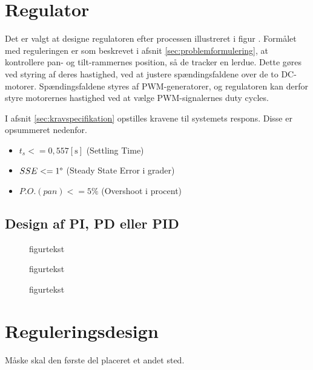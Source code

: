 \section{Regulator}
\label{sec:kontrollerdeign}
Det er valgt at designe regulatoren efter processen illustreret i figur .%
Formålet med reguleringen er som beskrevet i afsnit \ref{sec:problemformulering},
at kontrollere pan- og tilt-rammernes position, så de tracker en lerdue.
Dette gøres ved styring af deres hastighed, ved at justere spændingsfaldene over de
to DC-motorer. Spændingsfaldene styres af PWM-generatorer, og regulatoren
kan derfor styre motorernes hastighed ved at vælge PWM-signalernes duty cycles.

I afsnit \ref{sec:kravspecifikation} opstilles kravene til systemets respons.
Disse er opsummeret nedenfor.
\begin{itemize}
\item \(t_{s} <= 0,557 \mathrm{\left[s\right]}\) (Settling Time)
\item \(SSE <= 1 \degree\) (Steady State Error i grader)
\item \(P.O. (pan) <= 5 \%\) (Overshoot i procent)
\end{itemize}


\subsection{Design af PI, PD eller PID}
\begin{figure}[!th]
\centering
\begin{tikzpicture}[auto, node distance=2.6cm,>=latex']

\end{tikzpicture}
\caption[tekst i indholdsfortegnelsen]{figurtekst}
\label{fig:}
\end{figure}

\begin{figure}[!th]
\centering
\begin{tikzpicture}[auto, node distance=2.6cm,>=latex']

\end{tikzpicture}
\caption[tekst i indholdsfortegnelsen]{figurtekst}
\label{fig:}
\end{figure}

\begin{figure}[!th]
\centering
\begin{tikzpicture}[auto, node distance=2.6cm,>=latex']

\end{tikzpicture}
\caption[tekst i indholdsfortegnelsen]{figurtekst}
\label{fig:}
\end{figure}\section{Reguleringsdesign}
\label{sec:kontrollerdeign}
Måske skal den første del placeret et andet sted. \\

